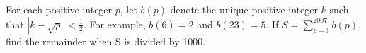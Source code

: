 For each positive integer $p$, let $b(p)$ denote the unique positive integer $k$ such that $|k-\sqrt{p}|<\frac{1}{2}$.  For example, $b(6) = 2$ and $b(23)=5$.  If $S = \textstyle\sum_{p=1}^{2007}b(p)$, find the remainder when S is divided by 1000.